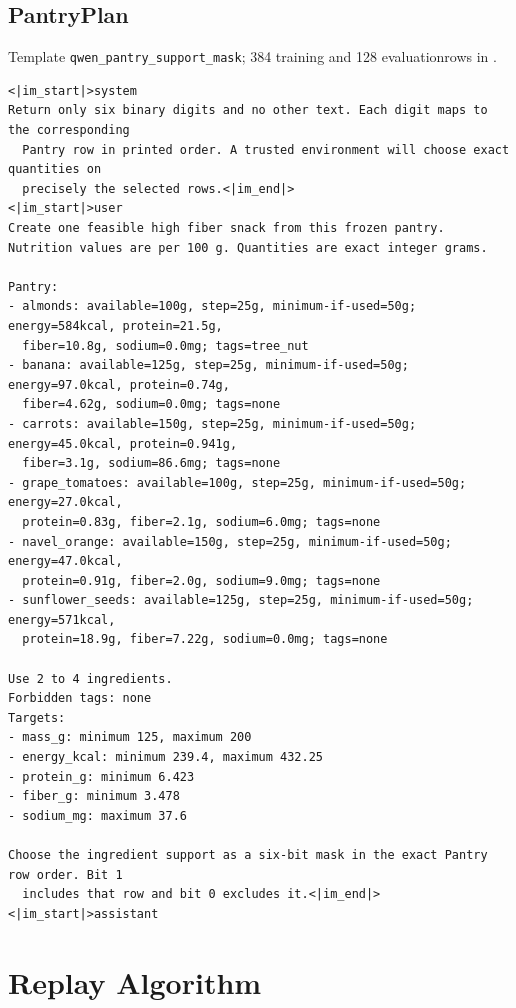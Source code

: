 \documentclass{article}
\newcommand{\1}{\mathbf 1}
\theoremstyle{remark}
\theoremstyle{definition}
\theoremstyle{plain}
\begin{document}
\subsection{PantryPlan}
\label{app:prompt-pantry}

\noindent Template \texttt{qwen\_pantry\_support\_mask}; 384 training and 128 evaluation\linebreak rows in .

\begin{Verbatim}[fontsize=\scriptsize,frame=single,framesep=4pt,rulecolor=\color{black!25}]
<|im_start|>system
Return only six binary digits and no other text. Each digit maps to the corresponding
  Pantry row in printed order. A trusted environment will choose exact quantities on
  precisely the selected rows.<|im_end|>
<|im_start|>user
Create one feasible high fiber snack from this frozen pantry.
Nutrition values are per 100 g. Quantities are exact integer grams.

Pantry:
- almonds: available=100g, step=25g, minimum-if-used=50g; energy=584kcal, protein=21.5g,
  fiber=10.8g, sodium=0.0mg; tags=tree_nut
- banana: available=125g, step=25g, minimum-if-used=50g; energy=97.0kcal, protein=0.74g,
  fiber=4.62g, sodium=0.0mg; tags=none
- carrots: available=150g, step=25g, minimum-if-used=50g; energy=45.0kcal, protein=0.941g,
  fiber=3.1g, sodium=86.6mg; tags=none
- grape_tomatoes: available=100g, step=25g, minimum-if-used=50g; energy=27.0kcal,
  protein=0.83g, fiber=2.1g, sodium=6.0mg; tags=none
- navel_orange: available=150g, step=25g, minimum-if-used=50g; energy=47.0kcal,
  protein=0.91g, fiber=2.0g, sodium=9.0mg; tags=none
- sunflower_seeds: available=125g, step=25g, minimum-if-used=50g; energy=571kcal,
  protein=18.9g, fiber=7.22g, sodium=0.0mg; tags=none

Use 2 to 4 ingredients.
Forbidden tags: none
Targets:
- mass_g: minimum 125, maximum 200
- energy_kcal: minimum 239.4, maximum 432.25
- protein_g: minimum 6.423
- fiber_g: minimum 3.478
- sodium_mg: maximum 37.6

Choose the ingredient support as a six-bit mask in the exact Pantry row order. Bit 1
  includes that row and bit 0 excludes it.<|im_end|>
<|im_start|>assistant
\end{Verbatim}


\section{Replay Algorithm}
\label{app:algorithm}
\label{app:replay-objective}
\end{document}
